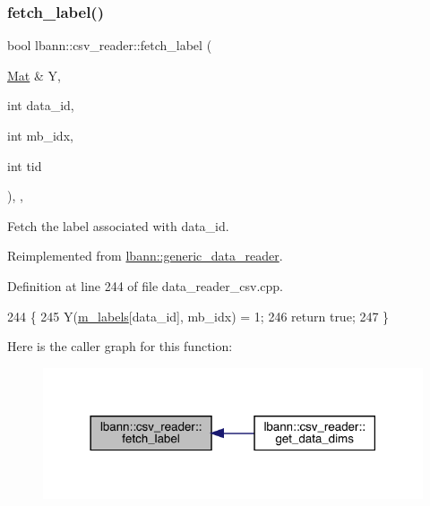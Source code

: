 \subsubsection{\texorpdfstring{fetch\+\_\+label()}{fetch\_label()}}
{\footnotesize\ttfamily bool lbann\+::csv\+\_\+reader\+::fetch\+\_\+label (\begin{DoxyParamCaption}\item[{\hyperlink{base_8hpp_a68f11fdc31b62516cb310831bbe54d73}{Mat} \&}]{Y,  }\item[{int}]{data\+\_\+id,  }\item[{int}]{mb\+\_\+idx,  }\item[{int}]{tid }\end{DoxyParamCaption})\hspace{0.3cm}{\ttfamily [override]}, {\ttfamily [protected]}, {\ttfamily [virtual]}}



Fetch the label associated with data\+\_\+id. 



Reimplemented from \hyperlink{classlbann_1_1generic__data__reader_a03627408c1d1aa28691d31232fe1dce5}{lbann\+::generic\+\_\+data\+\_\+reader}.



Definition at line 244 of file data\+\_\+reader\+\_\+csv.\+cpp.


\begin{DoxyCode}
244                                                                      \{
245   Y(\hyperlink{classlbann_1_1csv__reader_a1f11d02df556a4ec638f332ccfc03eb2}{m\_labels}[data\_id], mb\_idx) = 1;
246   \textcolor{keywordflow}{return} \textcolor{keyword}{true};
247 \}
\end{DoxyCode}
Here is the caller graph for this function\+:\nopagebreak
\begin{figure}[H]
\begin{center}
\leavevmode
\includegraphics[width=318pt]{classlbann_1_1csv__reader_a0c223375a08ed0b6a3a1fcc03c86c4ac_icgraph}
\end{center}
\end{figure}
\mbox{\label{classlbann_1_1csv__reader_acd3af11382da3057c3e72c46bf65f5d3}} 
